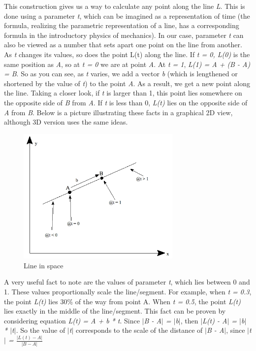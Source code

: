 \documentclass[times, 10pt,twocolumn]{article}
\begin{document}
This construction gives us a way to calculate any point along the line \emph{L}. This is done using a parameter \emph{t}, which can be imagined as a representation of time (the formula, realizing the parametric representation of a line, has a corresponding formula in the introductory physics of mechanics). In our case, parameter \emph{t} can also be viewed as a number  that sets apart one point on the line from another. As \emph{t} changes its values, so does the point L(t)  along the line.
If \emph{t = 0, L(0)} is the same position as \emph{A}, so at \emph{t = 0} we are at point \emph{A}. At \emph{t = 1},  \emph{L(1) = A + (B - A) = B}. So as you can see, as \emph{t} varies, we add a vector \emph{b} (which is lengthened or shortened by the value of \emph{t}) to the point \emph{A}. As a result, we get a new point along the line. Taking a closer look, if \emph{t} is larger than 1, this point lies somewhere on the opposite side of \emph{B} from \emph{A}. If \emph{t} is less than 0, \emph{L(t)} lies on the opposite side of \emph{A} from \emph{B}. Below is a picture \label{line_in_space} illustrating these facts in a graphical 2D view, although 3D version uses the same ideas.


\begin{figure}[H]
  \caption{Line in space}
  \label{line_in_space}
  \centering
  \includegraphics[width=80mm]{images/lines3d.jpg}
\end{figure}

A very useful fact to note are the values of parameter \emph{t}, which lies between 0 and 1. These values proportionally scale the line/segment. For example, when \emph{t = 0.3}, the point \emph{L(t)} lies 30\% of the way from point A. When \emph{t = 0.5}, the point \emph{L(t)} lies exactly in the middle of the line/segment. This fact can be proven by considering equation \emph{L(t) = A + b * t}. Since \emph{$|$B - A$|$ = $|$b$|$}, then \emph{$|$L(t) - A$|$ = $|$b$|$ * $|$t$|$}. So the value of \emph{$|$t$|$} corresponds to the scale of the distance of \emph{$|$B - A$|$}, since \emph{$|$t$|$ = $\frac{|L(t) - A|}{|B - A|}$ }
\end{document}
